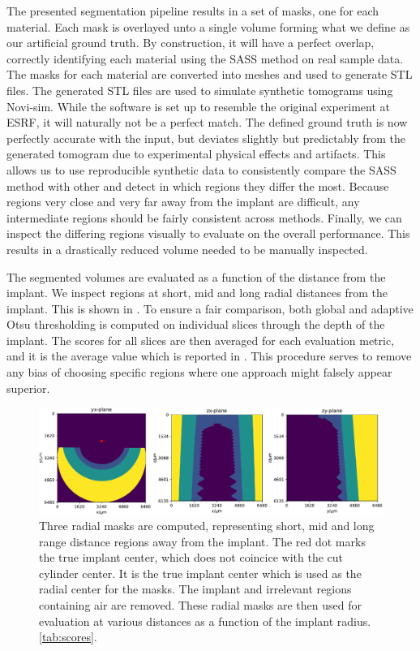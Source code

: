 The presented segmentation pipeline results in a set of masks, one for each
material. Each mask is overlayed unto a single volume forming what we define as
our artificial ground truth. By construction, it will have a perfect overlap,
correctly identifying each material using the SASS method on real sample data.
The masks for each material are converted into meshes and used to generate STL
files.  The generated STL files are used to simulate synthetic tomograms using
Novi-sim.  While the software is set up to resemble the original experiment at
ESRF, it will naturally not be a perfect match. The defined ground truth is now
perfectly accurate with the input, but deviates slightly but predictably from
the generated tomogram due to experimental physical effects and artifacts. This
allows us to use reproducible synthetic data to consistently compare the SASS
method with other and detect in which regions they differ the most. Because
regions very close and very far away from the implant are difficult, any
intermediate regions should be fairly consistent across methods.  Finally, we
can inspect the differing regions visually to evaluate on the overall
performance. This results in a drastically reduced volume needed to be manually
inspected.

The segmented volumes are evaluated as a function of the distance from the
implant. We inspect regions at short, mid and long radial distances from the
implant. This is shown in . To ensure a fair comparison, both
global and adaptive Otsu thresholding is computed on individual slices through the depth
of the implant. The scores for all slices are then averaged for each evaluation
metric, and it is the average value which is reported in .
This procedure serves to remove any bias of choosing specific regions where one
approach might falsely appear superior.

\begin{figure}
  \centering
  \includegraphics[width=\textwidth]{figures/radial_masks.pdf}
  \caption{Three radial masks are computed, representing short, mid and
	long range distance regions away from the implant. The red dot marks
	the true implant center, which does not coincice with the cut cylinder
	center. It is the true implant center which is used as the radial
	center for the masks. The implant and irrelevant regions containing air
	are removed.  These radial masks are then used for evaluation at
	various distances as a function of the implant radius.
	\cref{tab:scores}.}
  \label{fig:radialmasks}
\end{figure}


